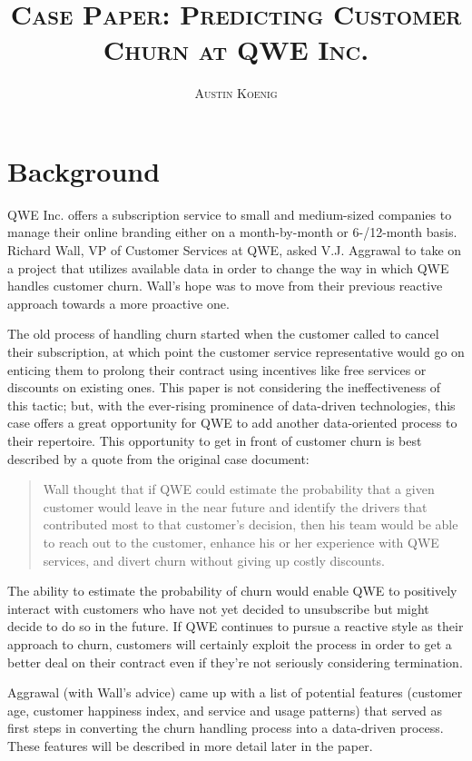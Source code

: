 \documentclass{article}
\title{\vspace{-2cm}\textsc{Case Paper: Predicting Customer Churn at QWE Inc.}}
\author{\textsc{Austin Koenig}}
\date{}
\begin{document}
	\maketitle
	\section{Background}
	
	QWE Inc. offers a subscription service to small and medium-sized companies to manage their online branding either on a month-by-month or 6-/12-month basis. Richard Wall, VP of Customer Services at QWE, asked V.J. Aggrawal to take on a project that utilizes available data in order to change the way in which QWE handles customer churn. Wall's hope was to move from their previous reactive approach towards a more proactive one.
	
	The old process of handling churn started when the customer called to cancel their subscription, at which point the customer service representative would go on enticing them to prolong their contract using incentives like free services or discounts on existing ones. This paper is not considering the ineffectiveness of this tactic; but, with the ever-rising prominence of data-driven technologies, this case offers a great opportunity for QWE to add another data-oriented process to their repertoire. This opportunity to get in front of customer churn is best described by a quote from the original case document:
	
	\begin{quote}
		Wall thought that if QWE could estimate the probability that a given customer would leave in the near future and identify the drivers that contributed most to that customer’s decision, then his team would be able to reach out to the customer, enhance his or her experience with QWE services, and divert churn without giving up costly discounts.
	\end{quote}
	
	The ability to estimate the probability of churn would enable QWE to positively interact with customers who have not yet decided to unsubscribe but might decide to do so in the future. If QWE continues to pursue a reactive style as their approach to churn, customers will certainly exploit the process in order to get a better deal on their contract even if they’re not seriously considering termination.
	
	Aggrawal (with Wall's advice) came up with a list of potential features (customer age, customer happiness index, and service and usage patterns) that served as first steps in converting the churn handling process into a data-driven process. These features will be described in more detail later in the paper.
	
\end{document}

